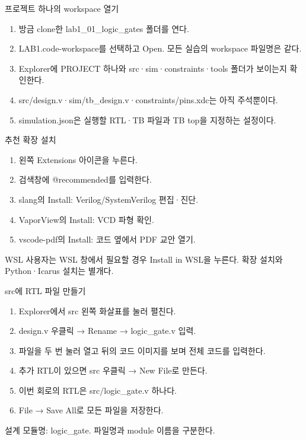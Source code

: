 \begin{frame}{프로젝트 하나의 workspace 열기}\relax
\small
\begin{enumerate}\setlength{\itemsep}{0.22cm}
\item 방금 clone한 lab1\_01\_logic\_gates 폴더를 연다.
\item LAB1.code-workspace를 선택하고 Open. 모든 실습의 workspace 파일명은 같다.
\item Explorer에 PROJECT 하나와 src·sim·constraints·tools 폴더가 보이는지 확인한다.
\item src/design.v·sim/tb\_design.v·constraints/pins.xdc는 아직 주석뿐이다.
\item simulation.json은 실행할 RTL·TB 파일과 TB top을 지정하는 설정이다.
\end{enumerate}

\end{frame}

\begin{frame}{추천 확장 설치}\relax
\small
\begin{enumerate}\setlength{\itemsep}{0.22cm}
\item 왼쪽 Extensions 아이콘을 누른다.
\item 검색창에 @recommended를 입력한다.
\item slang의 Install: Verilog/SystemVerilog 편집·진단.
\item VaporView의 Install: VCD 파형 확인.
\item vscode-pdf의 Install: 코드 옆에서 PDF 교안 열기.
\end{enumerate}
WSL 사용자는 WSL 창에서 필요할 경우 Install in WSL을 누른다. 확장 설치와 Python·Icarus 설치는 별개다.\par
\end{frame}

\begin{frame}{src에 RTL 파일 만들기}\relax
\small
\begin{enumerate}\setlength{\itemsep}{0.22cm}
\item Explorer에서 src 왼쪽 화살표를 눌러 펼친다.
\item design.v 우클릭 → Rename → logic\_gate.v 입력.
\item 파일을 두 번 눌러 열고 뒤의 코드 이미지를 보며 전체 코드를 입력한다.
\item 추가 RTL이 있으면 src 우클릭 → New File로 만든다.
\item 이번 회로의 RTL은 src/logic\_gate.v 하나다.
\item File → Save All로 모든 파일을 저장한다.
\end{enumerate}
설계 모듈명: logic\_gate. 파일명과 module 이름을 구분한다.\par
\end{frame}


